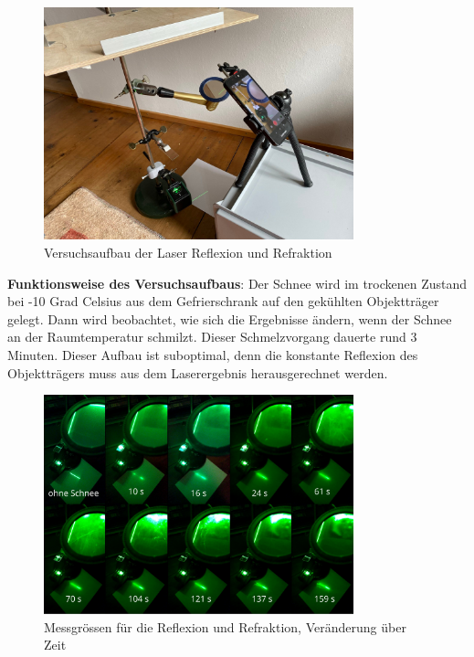 \begin{figure}
    \centering
    \includegraphics[width=0.8\textwidth]{Bilder/signal-2024-03-10-112013_006.jpeg}
    \caption{Versuchsaufbau der Laser Reflexion und Refraktion}
    \label{fig:LaserAufbau}
\end{figure}


\textbf{Funktionsweise des Versuchsaufbaus}:
Der Schnee wird im trockenen Zustand bei -10 Grad Celsius aus dem Gefrierschrank auf den gekühlten Objektträger gelegt. Dann wird beobachtet, wie sich die Ergebnisse ändern, wenn der Schnee an der Raumtemperatur schmilzt. Dieser Schmelzvorgang dauerte rund 3 Minuten. Dieser Aufbau ist suboptimal, denn die konstante Reflexion des Objektträgers muss aus dem Laserergebnis herausgerechnet werden.


\begin{figure}[H]
    \centering
    \includegraphics[width=0.8\textwidth]{Bilder/Screenshotfrom2024-04-0413-27-28.png}
    \caption{Messgrössen für die Reflexion und Refraktion, Veränderung über Zeit}
    \label{fig:LaserRef}
\end{figure}



